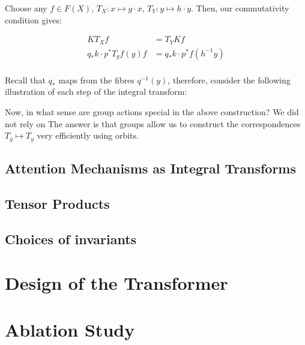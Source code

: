 \documentclass[12pt]{article}
\begin{document}
Choose any $f \in F(X)$, $T_X: x \mapsto g\cdot x$, $T_Y: y \mapsto h\cdot y$. Then, our commutativity condition gives:

\begin{align*}
  K T_X f &= T_Y K f \\
  q_* k \cdot p^*T_g f (y) f &= q_* k \cdot p^* f (h^{-1}y) \\
\end{align*}

Recall that $q_*$ maps from the fibres $q^{-1}(y)$, therefore, consider the following illustration of each step of the integral transform:




Now, in what sense are group actions special in the above construction? We did not rely on  The answer is that groups allow us to construct the correspondences $T_g \mapsto T_y$ very efficiently using orbits.   




\subsection*{Attention Mechanisms as Integral Transforms}



\subsection*{Tensor Products}


\subsection*{Choices of invariants}



\section{Design of the Transformer}


\section{Ablation Study}
\end{document}
